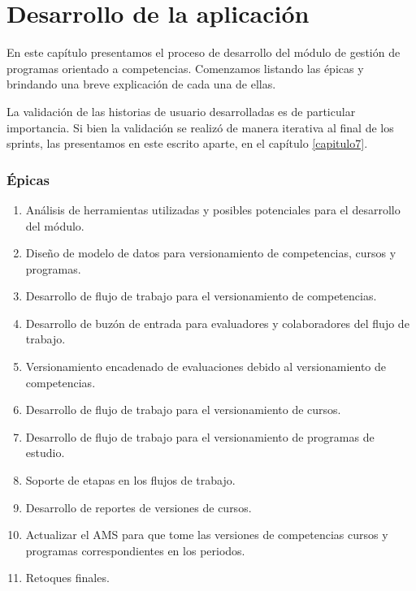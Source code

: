 \chapter{Desarrollo de la aplicación} %
\label{capitulo5} %
En este capítulo presentamos el proceso de desarrollo del módulo de gestión de programas orientado a competencias. Comenzamos listando las épicas y brindando una breve explicación de cada una de ellas.

La validación de las historias de usuario desarrolladas es de particular importancia. Si bien la validación se realizó de manera iterativa al final de los sprints, las presentamos en este escrito aparte, en el capítulo \ref{capitulo7}.

\subsection*{Épicas}
\begin{enumerate}
	\item Análisis de herramientas utilizadas y posibles potenciales para el desarrollo del módulo.
	\item Diseño de modelo de datos para versionamiento de competencias, cursos y programas.
	\item Desarrollo de flujo de trabajo para el versionamiento de competencias.
	\item Desarrollo de buzón de entrada para evaluadores y colaboradores del flujo de trabajo.
	\item Versionamiento encadenado de evaluaciones debido al versionamiento de competencias.
	\item Desarrollo de flujo de trabajo para el versionamiento de cursos.
	\item Desarrollo de flujo de trabajo para el versionamiento de programas de estudio.
 	\item Soporte de etapas en los flujos de trabajo.
	\item Desarrollo de reportes de versiones de cursos.
	\item Actualizar el AMS para que tome las versiones de competencias cursos y programas correspondientes en los periodos.
	\item Retoques finales.
\end{enumerate}

